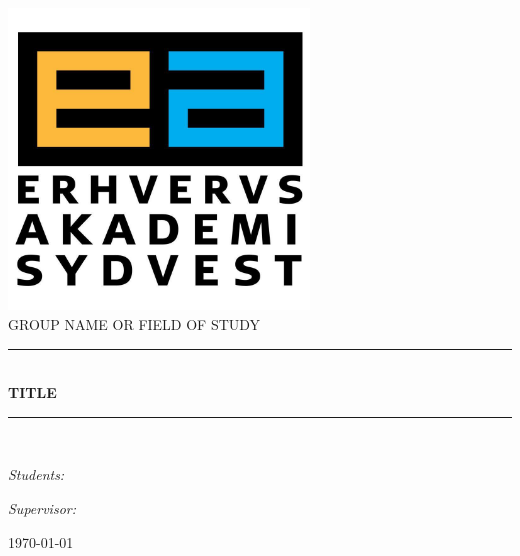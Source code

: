 \newcommand{\HRule}{\rule{\linewidth}{0.5 mm}}
\begin{titlepage}

\begin{center}
\includegraphics[width=0.6\textwidth]{images/easv.jpg}\\[0.5cm]

\textsc{\Large GROUP NAME OR FIELD OF STUDY %
	}\\[0.6cm]

\HRule \\[0.9cm]
{ \Huge \bfseries TITLE %
	}\\[0.4cm]

\HRule \\[0.5cm]


\begin{minipage}{0.49\textwidth}
\begin{flushleft} \large
\emph{Students:}\\
\end{flushleft}
\end{minipage}
\begin{minipage}{0.49\textwidth}
\begin{flushright} \large
\emph{Supervisor:} \\
\end{flushright}
\end{minipage}

\vfill

{\large \today}



\end{center}

\end{titlepage}
